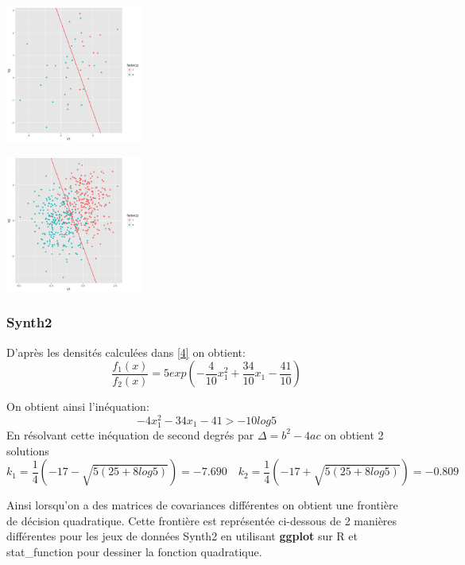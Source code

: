 \documentclass[10pt]{article}
\begin{document}
			\begin{minipage}{.5\textwidth}
	\includegraphics[width=45mm]{Figures/Exo2/linear_synth140.png}
	\label{fig:front_ceuc}
\end{minipage}%
\hspace{0.02\linewidth}
\begin{minipage}{.5\textwidth}
	\includegraphics[width=45mm]{Figures/Exo2/linear_synth1500.png}
	\label{fig:front_kppv}
\end{minipage}

\subsubsection{Synth2}
D'après les densités calculées dans \eqref{4} on obtient: \[\frac{f_{1}(x)}{f_{2}(x)} = 5exp(-\frac{4}{10}x_{1}^{2} + \frac{34}{10} x_{1} - \frac{41}{10})\]

On obtient ainsi l'inéquation: \[-4x_{1}^{2}  - 34x_{1} - 41 > -10log5\]
En résolvant cette inéquation de second degrés par $\Delta = b^{2} - 4ac$ on obtient 2 solutions
\[k_{1} = \frac{1}{4} (-17 - \sqrt{5 (25 + 8 log5)})= -7.690 \quad k_{2} = \frac{1}{4} (-17 +\sqrt{5 (25 + 8 log5)} ) = -0.809 \]

Ainsi lorsqu'on a des matrices de covariances différentes on obtient une frontière de décision quadratique. Cette frontière est représentée  ci-dessous de 2 manières différentes pour les jeux de données Synth2 en utilisant \textbf{ggplot\textit{}} sur R et stat\_function pour dessiner la fonction quadratique.\\
\end{document}
